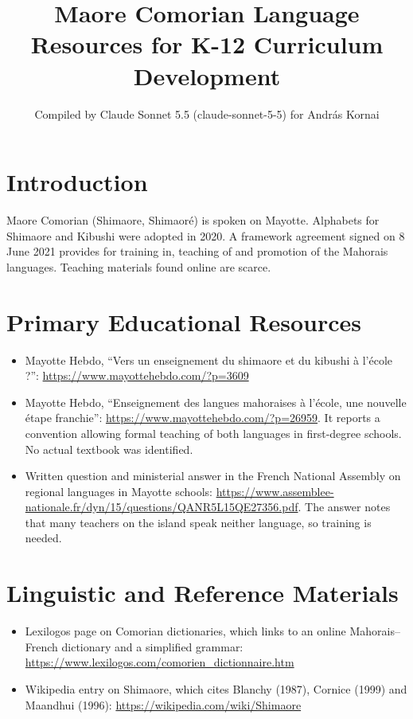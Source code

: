 \documentclass[12pt]{article}
\title{Maore Comorian Language Resources for K-12 Curriculum Development}
\author{Compiled by Claude Sonnet 5.5 (claude-sonnet-5-5) for Andr\'as Kornai}
\date{}
\begin{document}
\maketitle

\section{Introduction}
Maore Comorian (Shimaore, Shimaor\'e) is spoken on Mayotte. Alphabets for Shimaore and Kibushi were adopted in 2020. A framework agreement signed on 8 June 2021 provides for training in, teaching of and promotion of the Mahorais languages. Teaching materials found online are scarce.

\section{Primary Educational Resources}
\begin{itemize}
\item Mayotte Hebdo, ``Vers un enseignement du shimaore et du kibushi \`a l'\'ecole ?'': \url{https://www.mayottehebdo.com/?p=3609}
\item Mayotte Hebdo, ``Enseignement des langues mahoraises \`a l'\'ecole, une nouvelle \'etape franchie'': \url{https://www.mayottehebdo.com/?p=26959}. It reports a convention allowing formal teaching of both languages in first-degree schools. No actual textbook was identified.
\item Written question and ministerial answer in the French National Assembly on regional languages in Mayotte schools: \url{https://www.assemblee-nationale.fr/dyn/15/questions/QANR5L15QE27356.pdf}. The answer notes that many teachers on the island speak neither language, so training is needed.
\end{itemize}

\section{Linguistic and Reference Materials}
\begin{itemize}
\item Lexilogos page on Comorian dictionaries, which links to an online Mahorais--French dictionary and a simplified grammar: \url{https://www.lexilogos.com/comorien_dictionnaire.htm}
\item Wikipedia entry on Shimaore, which cites Blanchy (1987), Cornice (1999) and Maandhui (1996): \url{https://wikipedia.com/wiki/Shimaore}
\end{itemize}
\end{document}
